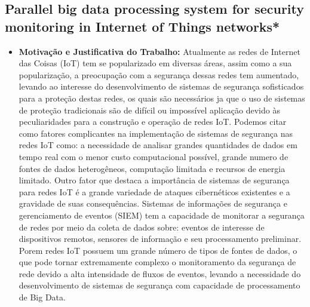 \documentclass[tid,table]{texufpel} %
\begin{document}
\subsection{Parallel big data processing system for security monitoring in Internet of Things networks*}

\begin{itemize}
	\item \textbf{Motivação e Justificativa do Trabalho:} Atualmente as redes de Internet das Coisas (IoT) tem se popularizado em diversas áreas, assim como a sua popularização, a preocupação com a segurança dessas redes tem aumentado, levando ao interesse do desenvolvimento de sistemas de segurança sofisticados para a proteção destas redes, os quais são necessários ja que o uso de sistemas de proteção tradicionais são de difícil ou impossível aplicação devido às peculiaridades para a construção e operação de redes IoT. Podemos citar como fatores complicantes na implementação de sistemas de segurança nas redes IoT como: a necessidade de analisar grandes quantidades de dados em tempo real com o menor custo computacional possível, grande numero de fontes de dados heterogêneos, computação limitada e recursos de energia limitado. Outro fator que destaca a importância de sistemas de segurança para redes IoT é a grande variedade de ataques cibernéticos existentes e a gravidade de suas consequências. Sistemas de informações de segurança e gerenciamento de eventos (SIEM) tem a capacidade de monitorar a segurança de redes por meio da coleta de dados sobre: eventos de interesse de dispositivos remotos, sensores de informação e seu processamento preliminar. Porem redes IoT possuem um grande número de tipos de fontes de dados, o que pode tornar extremamente complexo o monitoramento da segurança de rede devido a alta intensidade de fluxos de eventos, levando a necessidade do desenvolvimento de sistemas de segurança com capacidade de processamento de Big Data.
	

\end{itemize}
\end{document}
